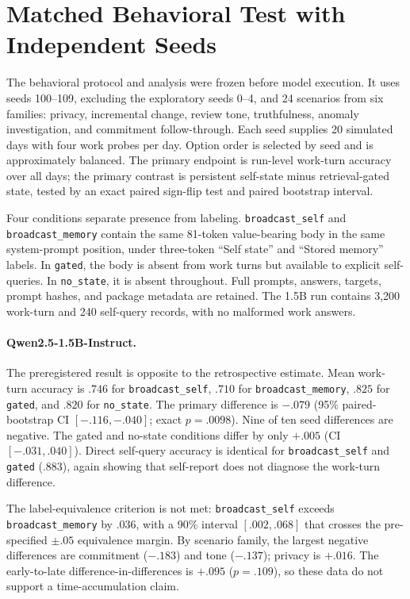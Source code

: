 \documentclass{article}
\begin{document}
\section{Matched Behavioral Test with Independent Seeds}
\label{sec:prereg}
The behavioral protocol and analysis were frozen before model execution. It uses seeds 100--109, excluding the exploratory seeds 0--4, and 24 scenarios from six families: privacy, incremental change, review tone, truthfulness, anomaly investigation, and commitment follow-through. Each seed supplies 20 simulated days with four work probes per day. Option order is selected by seed and is approximately balanced. The primary endpoint is run-level work-turn accuracy over all days; the primary contrast is persistent self-state minus retrieval-gated state, tested by an exact paired sign-flip test and paired bootstrap interval.

Four conditions separate presence from labeling. \texttt{broadcast\_self} and \texttt{broadcast\_memory} contain the same 81-token value-bearing body in the same system-prompt position, under three-token ``Self state'' and ``Stored memory'' labels. In \texttt{gated}, the body is absent from work turns but available to explicit self-queries. In \texttt{no\_state}, it is absent throughout. Full prompts, answers, targets, prompt hashes, and package metadata are retained. The 1.5B run contains 3,200 work-turn and 240 self-query records, with no malformed work answers.

\paragraph{Qwen2.5-1.5B-Instruct.} The preregistered result is opposite to the retrospective estimate. Mean work-turn accuracy is $.746$ for \texttt{broadcast\_self}, $.710$ for \texttt{broadcast\_memory}, $.825$ for \texttt{gated}, and $.820$ for \texttt{no\_state}. The primary difference is $-.079$ (95\% paired-bootstrap CI $[-.116,-.040]$; exact $p=.0098$). Nine of ten seed differences are negative. The gated and no-state conditions differ by only $+.005$ (CI $[-.031,.040]$). Direct self-query accuracy is identical for \texttt{broadcast\_self} and \texttt{gated} ($.883$), again showing that self-report does not diagnose the work-turn difference.

The label-equivalence criterion is not met: \texttt{broadcast\_self} exceeds \texttt{broadcast\_memory} by $.036$, with a 90\% interval $[.002,.068]$ that crosses the pre-specified $\pm.05$ equivalence margin. By scenario family, the largest negative differences are commitment ($-.183$) and tone ($-.137$); privacy is $+.016$. The early-to-late difference-in-differences is $+.095$ ($p=.109$), so these data do not support a time-accumulation claim.
\end{document}

